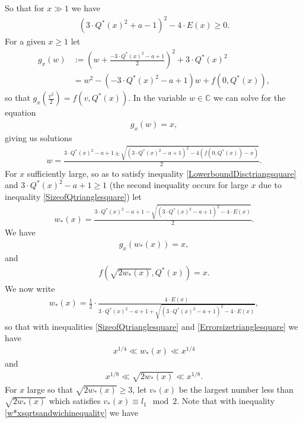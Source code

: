 \documentclass[12pt]{amsart}
\newcommand{\1}{\mathmybb{1}}
\begin{document}
So that for $x \gg 1$ we have
\begin{align}
\label{LowerboundDisctriangsquare}
(3\cdot Q^{*}(x)^2 + a - 1)^2-4\cdot E(x) \geq 0.
\end{align}
For a given $x \geq 1$ let
\begin{align*}
g_{x}(w) &:= \left(w+\frac{-3\cdot Q^{*}(x)^2-a+1}{2}\right)^2 +3\cdot Q^{*}(x)^2\\
&= w^2 -\left(-3\cdot Q^{*}(x)^2-a+1\right)w + f(0,Q^{*}(x)),
\end{align*}
so that $g_{x}(\frac{v^2}{2}) = f(v,Q^{*}(x))$. In the variable $w \in \mathbb{C}$ we can solve for the equation
\begin{align*}
g_{x}(w) = x,
\end{align*}
giving us solutions
\begin{align*}
w = \frac{3\cdot Q^{*}(x)^2-a+1 \pm \sqrt{(3\cdot Q^{*}(x)^2-a+1)^2 - 4(f(0,Q^{*}(x))-x)}}{2}.
\end{align*}
For $x$ sufficiently large, so as to satisfy inequality \eqref{LowerboundDisctriangsquare} and $3\cdot Q^{*}(x)^2-a+1 \geq 1$ (the second inequality occurs for large $x$ due to inequality \eqref{SizeofQtrianglesquare}) let
\begin{align*}
w_{*}(x) = \frac{3\cdot Q^{*}(x)^2-a+1 - \sqrt{(3\cdot Q^{*}(x)^2-a+1)^2 - 4\cdot E(x)}}{2}.
\end{align*}
We have 
\begin{align*}
g_{x}(w_{*}(x)) = x,
\end{align*}
and 
\begin{align*}
f\left(\sqrt{2w_{*}(x)},Q^{*}(x)\right) = x.
\end{align*}
We now write
\begin{align*}
w_{*}(x) = \frac{1}{2}\cdot\frac{4\cdot E(x)}{3\cdot Q^{*}(x)^2-a+1+\sqrt{(3\cdot Q^{*}(x)^2-a+1)^2 - 4\cdot E(x)}},
\end{align*}
so that with inequalities \eqref{SizeofQtrianglesquare} and \eqref{Errorsizetrianglesquare} we have 
\begin{align*}
x^{1/4}\ll w_{*}(x) \ll x^{1/4}
\end{align*}
and
\begin{align}
\label{w*xsqrtsandwichinequality}
x^{1/8}\ll\sqrt{2w_{*}(x)} \ll x^{1/8}.
\end{align}
For $x$ large so that $\sqrt{2w_{*}(x)} \geq 3$, let $v_{*}(x)$ be the largest number less than $\sqrt{2w_{*}(x)}$ which satisfies $v_{*}(x) \equiv l_{1} \mod 2$. Note that with inequality \eqref{w*xsqrtsandwichinequality} we have
\end{document}
